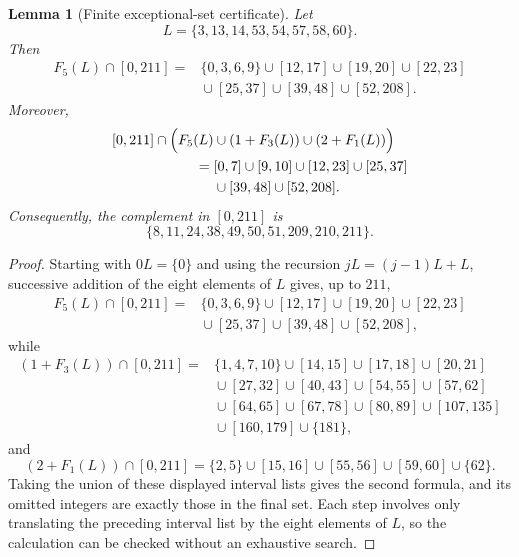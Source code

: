 \documentclass[12pt]{article}
\theoremstyle{plain}
\newtheorem{lemma}[theorem]{Lemma}
\begin{document}
\begin{lemma}[Finite exceptional-set certificate]\label{lem:finiteexception}
Let
\[
 L=\{3,13,14,53,54,57,58,60\}.
\]
Then
\[
\begin{aligned}
F_5(L)\cap[0,211]
={}&\{0,3,6,9\}\cup[12,17]\cup[19,20]\cup[22,23]\\
 &{}\cup[25,37]\cup[39,48]\cup[52,208].
\end{aligned}
\]
Moreover,
\[
\begin{aligned}
[0,211]\cap\Bigl(F_5(L)&\cup(1+F_3(L))\cup(2+F_1(L))\Bigr)\\
={}&[0,7]\cup[9,10]\cup[12,23]\cup[25,37]\\
 &{}\cup[39,48]\cup[52,208].
\end{aligned}
\]
Consequently, the complement in $[0,211]$ is
\[
 \{8,11,24,38,49,50,51,209,210,211\}.
\]
\end{lemma}

\begin{proof}
Starting with $0L=\{0\}$ and using the recursion
$jL=(j-1)L+L$, successive addition of the eight elements of $L$ gives,
up to $211$,
\[
\begin{aligned}
F_5(L)\cap[0,211]={}&\{0,3,6,9\}\cup[12,17]\cup[19,20]\cup[22,23]\\
 &{}\cup[25,37]\cup[39,48]\cup[52,208],
\end{aligned}
\]
while
\[
\begin{aligned}
(1+F_3(L))\cap[0,211]
={}&\{1,4,7,10\}\cup[14,15]\cup[17,18]\cup[20,21]\\
 &{}\cup[27,32]\cup[40,43]\cup[54,55]\cup[57,62]\\
 &{}\cup[64,65]\cup[67,78]\cup[80,89]\cup[107,135]\\
 &{}\cup[160,179]\cup\{181\},
\end{aligned}
\]
and
\[
 (2+F_1(L))\cap[0,211]
 =\{2,5\}\cup[15,16]\cup[55,56]\cup[59,60]\cup\{62\}.
\]
Taking the union of these displayed interval lists gives the second
formula, and its omitted integers are exactly those in the final set.
Each step involves only translating the preceding interval list by the
eight elements of $L$, so the calculation can be checked without an
exhaustive search.
\end{proof}
\end{document}

